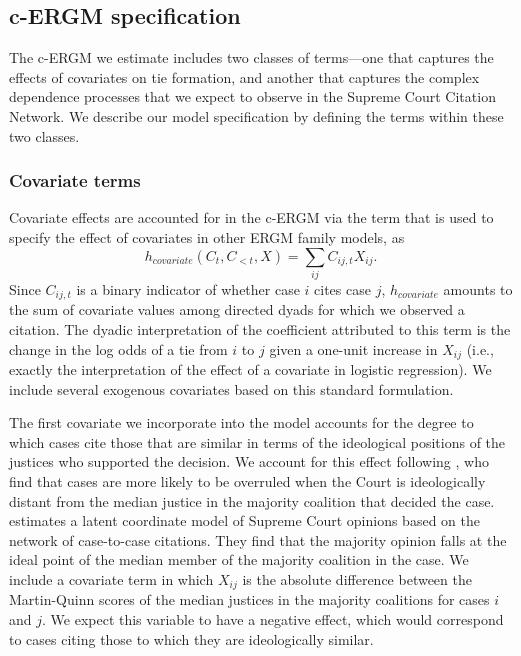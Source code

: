 \documentclass{cup-pan}
\begin{document}
\subsection{c-ERGM specification}

The c-ERGM we estimate includes two classes of terms---one that captures the effects of covariates on tie formation, and another that captures the complex dependence processes that we expect to observe in the Supreme Court Citation Network. We describe our model specification by defining the terms within these two classes.


\subsubsection{Covariate terms}\label{covariate_terms}

Covariate effects are accounted for in the c-ERGM via the term that is used to specify the effect of covariates in other ERGM family models, as
$$h_{covariate}(C_t,C_{<t},X) =  \sum_{ij} C_{ij,t}X_{ij}.$$ Since $C_{ij,t}$ is a binary indicator of whether case $i$ cites case $j$, $h_{covariate}$ amounts to the sum of covariate values among directed dyads for which we observed a citation. The dyadic interpretation of the coefficient attributed to this term is the change in the log odds of a tie from $i$ to $j$ given a one-unit increase in $X_{ij}$ (i.e., exactly the interpretation of the effect of a covariate in logistic regression). We include several exogenous covariates based on this standard formulation. 

The first covariate we incorporate into the model accounts for the degree to which cases cite those that are similar in terms of the ideological positions of the justices who supported the decision. We account for this effect following \citet{spriggs2001explaining}, who find that cases are more likely to be overruled when the Court is ideologically distant from the median justice in the majority coalition that decided the case. \citet{clark2010locating} estimates a latent coordinate model of Supreme Court opinions based on the network of case-to-case citations. They find that the majority opinion falls at the ideal point of the median member of the majority coalition in the case. We include a covariate term in which $X_{ij}$ is the absolute difference between the Martin-Quinn scores \citep{martin2002dynamic} of the median justices in the majority coalitions for cases $i$ and $j$. We expect this variable to have a negative effect, which would correspond to cases citing those to which they are ideologically similar. %
\end{document}

